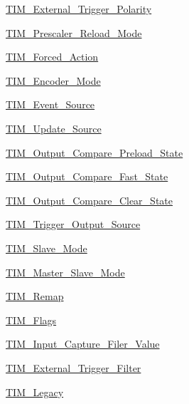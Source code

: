 \begin{DoxyCompactItemize}
\item 
\hyperlink{group___t_i_m___external___trigger___polarity}{T\-I\-M\-\_\-\-External\-\_\-\-Trigger\-\_\-\-Polarity}
\item 
\hyperlink{group___t_i_m___prescaler___reload___mode}{T\-I\-M\-\_\-\-Prescaler\-\_\-\-Reload\-\_\-\-Mode}
\item 
\hyperlink{group___t_i_m___forced___action}{T\-I\-M\-\_\-\-Forced\-\_\-\-Action}
\item 
\hyperlink{group___t_i_m___encoder___mode}{T\-I\-M\-\_\-\-Encoder\-\_\-\-Mode}
\item 
\hyperlink{group___t_i_m___event___source}{T\-I\-M\-\_\-\-Event\-\_\-\-Source}
\item 
\hyperlink{group___t_i_m___update___source}{T\-I\-M\-\_\-\-Update\-\_\-\-Source}
\item 
\hyperlink{group___t_i_m___output___compare___preload___state}{T\-I\-M\-\_\-\-Output\-\_\-\-Compare\-\_\-\-Preload\-\_\-\-State}
\item 
\hyperlink{group___t_i_m___output___compare___fast___state}{T\-I\-M\-\_\-\-Output\-\_\-\-Compare\-\_\-\-Fast\-\_\-\-State}
\item 
\hyperlink{group___t_i_m___output___compare___clear___state}{T\-I\-M\-\_\-\-Output\-\_\-\-Compare\-\_\-\-Clear\-\_\-\-State}
\item 
\hyperlink{group___t_i_m___trigger___output___source}{T\-I\-M\-\_\-\-Trigger\-\_\-\-Output\-\_\-\-Source}
\item 
\hyperlink{group___t_i_m___slave___mode}{T\-I\-M\-\_\-\-Slave\-\_\-\-Mode}
\item 
\hyperlink{group___t_i_m___master___slave___mode}{T\-I\-M\-\_\-\-Master\-\_\-\-Slave\-\_\-\-Mode}
\item 
\hyperlink{group___t_i_m___remap}{T\-I\-M\-\_\-\-Remap}
\item 
\hyperlink{group___t_i_m___flags}{T\-I\-M\-\_\-\-Flags}
\item 
\hyperlink{group___t_i_m___input___capture___filer___value}{T\-I\-M\-\_\-\-Input\-\_\-\-Capture\-\_\-\-Filer\-\_\-\-Value}
\item 
\hyperlink{group___t_i_m___external___trigger___filter}{T\-I\-M\-\_\-\-External\-\_\-\-Trigger\-\_\-\-Filter}
\item 
\hyperlink{group___t_i_m___legacy}{T\-I\-M\-\_\-\-Legacy}
\end{DoxyCompactItemize}
